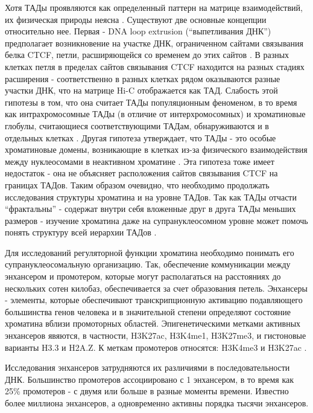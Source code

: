     Хотя ТАДы проявляются как определенный паттерн на матрице взаимодействий, их физическая природы неясна \cite{pal_hi-c_2019}. Существуют две основные концепции относительно нее. Первая - DNA loop extrusion (``выпетливания ДНК'') предполагает возникновение на участке ДНК, ограниченном сайтами связывания белка CTCF, петли, расширяющейся со временем до этих сайтов \cite{sanborn_chromatin_2015}. В разных клетках петля в пределах сайтов связывания CTCF находится на разных стадиях расширения - соответственно в разных клетках рядом оказываются разные участки ДНК, что на матрице Hi-C отображается как ТАД. Слабость этой гипотезы в том, что она считает ТАДы популяционным феноменом, в то время как интрахромосомные ТАДы (в отличие от интерхромосомных) и хроматиновые глобулы, считающиеся соответствующими ТАДам, обнаруживаются и в отдельных клетках \cite{nagano_single-cell_2013}. Другая гипотеза утверждает, что ТАДы - это особые хроматиновые домены, возникающие в клетках из-за физического взаимодействия между нуклеосомами в неактивном хроматине \cite{ulianov_active_2016}. Эта гипотеза тоже имеет недостаток - она не объясняет расположения сайтов связывания CTCF на границах ТАДов. Таким образом очевидно, что необходимо продолжать исследования структуры хроматина и на уровне ТАДов. Так как ТАДы отчасти ``фрактальны'' -  содержат внутри себя вложенные друг в друга ТАДы меньших размеров - изучение хроматина даже на супрануклеосомном уровне может помочь понять структуру всей иерархии ТАДов \cite{phillips-cremins_architectural_2013,norton_detecting_2018}. 
    
    Для исследований регуляторной функции хроматина необходимо понимать его супрануклеосомальную организацию. Так, обеспечение коммуникации между энхансером и промотером, которые могут располагаться на расстояниях до нескольких сотен килобаз, обеспечивается за счет образования петель. Энхансеры - элементы, которые обеспечивают транскрипционную активацию подавляющего большинства генов человека и в значительной степени определяют состояние хроматина вблизи промоторных областей. Эпигенетическими метками активных энхансеров явяются, в частности, H3K27ac, H3K4me1, H3K27me3, и гистоновые варианты H3.3 и H2A.Z. К меткам промотеров относятся: H3K4me3 и H3K27ac \cite{nizovtseva_towards_2017}. 
    
    Исследования энхансеров затрудняются их различиями в последовательности ДНК. Большинство промотеров ассоциировано с 1 энхансером, в то время как 25\% промотеров - с двумя или больше в разные моменты времени. Известно более миллиона энхансеров, а одновременно активны порядка тысячи энхансеров. 
    
